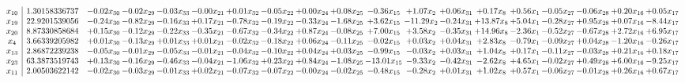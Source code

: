 \documentclass[9pt]{article}
\begin{document}
 \[\begin{array}{c| c c@{\hskip 2pt} c@{\hskip 2pt} c@{\hskip 2pt} c@{\hskip 2pt} c@{\hskip 2pt} c@{\hskip 2pt} c@{\hskip 2pt} c@{\hskip 2pt} c@{\hskip 2pt} c@{\hskip 2pt} c@{\hskip 2pt} c@{\hskip 2pt} c@{\hskip 2pt} c@{\hskip 2pt} c@{\hskip 2pt} c@{\hskip 2pt} c@{\hskip 2pt} }
 x_{10}   &  1.30158336737 & -0.02 x_{30} & -0.02 x_{29} & -0.03 x_{33} & -0.00 x_{21} & +  0.01 x_{32} & -0.05 x_{22} & +  0.00 x_{24} & +  0.08 x_{25} & -0.36 x_{15} & +  1.07 x_{2} & +  0.06 x_{31} & +  0.17 x_{8} & +  0.56 x_{1} & -0.05 x_{27} & -0.06 x_{28} & +  0.20 x_{16} & +  0.05 x_{17}\\
 x_{19}   &  22.9201539056 & -0.24 x_{30} & -0.82 x_{29} & -0.16 x_{33} & +  0.17 x_{21} & -0.78 x_{32} & -0.19 x_{22} & -0.33 x_{24} & -1.68 x_{25} & +  3.62 x_{15} & -11.29 x_{2} & -0.24 x_{31} & + 13.87 x_{8} & +  5.04 x_{1} & -0.28 x_{27} & +  0.95 x_{28} & +  0.07 x_{16} & -8.44 x_{17}\\
 x_{20}   &  8.87330858684 & +  0.15 x_{30} & -0.12 x_{29} & -0.22 x_{33} & -0.35 x_{21} & -0.67 x_{32} & -0.34 x_{22} & +  0.87 x_{24} & -0.08 x_{25} & +  7.00 x_{15} & +  3.58 x_{2} & -0.35 x_{31} & + 14.96 x_{8} & -2.36 x_{1} & -0.52 x_{27} & -0.67 x_{28} & +  2.72 x_{16} & +  6.95 x_{17}\\
 x_{4}   &  3.66339205982 & +  0.01 x_{30} & -0.13 x_{29} & +  0.01 x_{33} & +  0.01 x_{21} & -0.02 x_{32} & -0.18 x_{22} & +  0.06 x_{24} & -0.11 x_{25} & -0.02 x_{15} & +  0.03 x_{2} & +  0.04 x_{31} & +  2.83 x_{8} & -0.79 x_{1} & -0.09 x_{27} & +  0.04 x_{28} & -1.20 x_{16} & -0.26 x_{17}\\
 x_{13}   &  2.86872239238 & -0.05 x_{30} & -0.01 x_{29} & -0.05 x_{33} & -0.01 x_{21} & -0.04 x_{32} & -0.10 x_{22} & +  0.04 x_{24} & +  0.03 x_{25} & -0.99 x_{15} & -0.03 x_{2} & +  0.03 x_{31} & +  1.04 x_{8} & +  0.17 x_{1} & -0.11 x_{27} & -0.03 x_{28} & +  0.21 x_{16} & +  0.18 x_{17}\\
 x_{23}   &  63.3873519743 & +  0.13 x_{30} & -0.16 x_{29} & -0.46 x_{33} & -0.04 x_{21} & -1.06 x_{32} & +  0.23 x_{22} & +  0.84 x_{24} & -1.08 x_{25} & -13.01 x_{15} & -9.33 x_{2} & -0.42 x_{31} & -2.62 x_{8} & +  4.65 x_{1} & -0.02 x_{27} & +  0.49 x_{28} & +  6.00 x_{16} & -9.25 x_{17}\\
 x_{11}   &  2.00503622142 & -0.02 x_{30} & -0.03 x_{29} & -0.01 x_{33} & +  0.02 x_{21} & -0.07 x_{32} & -0.07 x_{22} & -0.00 x_{24} & -0.02 x_{25} & -0.48 x_{15} & -0.28 x_{2} & +  0.01 x_{31} & +  1.02 x_{8} & +  0.57 x_{1} & -0.06 x_{27} & -0.01 x_{28} & +  0.26 x_{16} & +  0.67 x_{17}\\

\end{array}\]
\end{document}
